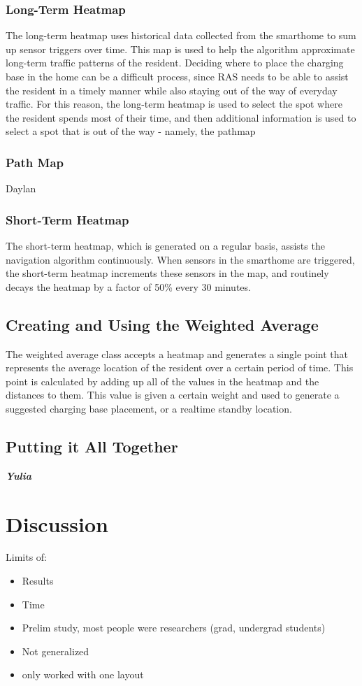 \documentclass[11pt, conference, a4paper]{IEEEtran}
\begin{document}
\subsubsection{Long-Term Heatmap}
The long-term heatmap uses historical data collected from the smarthome to sum up sensor triggers over time. This map is used to help the algorithm approximate long-term traffic patterns of the resident. Deciding where to place the charging base in the home can be a difficult process, since RAS needs to be able to assist the resident in a timely manner while also staying out of the way of everyday traffic. For this reason, the long-term heatmap is used to select the spot where the resident spends most of their time, and then additional information is used to select a spot that is out of the way - namely, the pathmap


\subsubsection{Path Map}
Daylan


\subsubsection{Short-Term Heatmap}
The short-term heatmap, which is generated on a regular basis, assists the navigation algorithm continuously. When sensors in the smarthome are triggered, the short-term heatmap increments these sensors in the map, and routinely decays the heatmap by a factor of 50\% every 30 minutes. 


\subsection{Creating and Using the Weighted Average}
The weighted average class accepts a heatmap and generates a single point that represents the average location of the resident over a certain period of time. This point is calculated by adding up all of the values in the heatmap and the distances to them. This value is given a certain weight and used to generate a suggested charging base placement, or a realtime standby location.         

\subsection{Putting it All Together}
\textit{\textbf{Yulia}}


\section{Discussion}
Limits of:
\begin{itemize}
    \item Results
    \item Time
    \item Prelim study, most people were researchers (grad, undergrad students)
    \item Not generalized
    \item only worked with one layout
\end{itemize}
\end{document}
